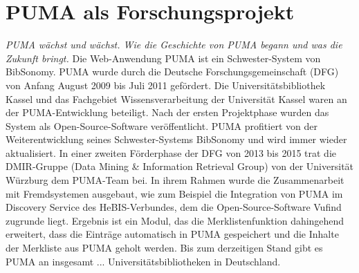\documentclass[b5paper,11pt,twoside]{scrbook} %
\begin{document}
\section{PUMA als Forschungsprojekt}
\textit{PUMA wächst und wächst. Wie die Geschichte von PUMA begann und was die Zukunft bringt.}
\newline
\newline
Die Web-Anwendung PUMA ist ein Schwester-System von BibSonomy.  PUMA wurde durch die Deutsche Forschungsgemeinschaft (DFG) von Anfang August 2009 bis Juli 2011 gefördert. Die Universitätsbibliothek Kassel und das Fachgebiet Wissensverarbeitung der Universität Kassel waren an der PUMA-Entwicklung beteiligt. Nach der ersten Projektphase wurden das System als Open-Source-Software veröffentlicht. PUMA profitiert von der Weiterentwicklung seines Schwester-Systems BibSonomy und wird immer wieder aktualisiert. In einer zweiten Förderphase der DFG von 2013 bis 2015 trat die DMIR-Gruppe (Data Mining \& Information Retrieval Group) von der Universität Würzburg dem PUMA-Team bei. In ihrem Rahmen wurde die Zusammenarbeit mit Fremdsystemen ausgebaut, wie zum Beispiel die Integration von PUMA im Discovery Service des HeBIS-Verbundes, dem die Open-Source-Software Vufind zugrunde liegt. Ergebnis ist ein Modul, das die Merklistenfunktion dahingehend erweitert, dass die Einträge automatisch in PUMA gespeichert und die Inhalte der Merkliste aus PUMA geholt werden. Bis zum derzeitigen Stand gibt es PUMA an insgesamt ... Universitätsbibliotheken in Deutschland.
\renewcommand{\indexname}{Stichwortverzeichnis}
\printindex
\end{document}
